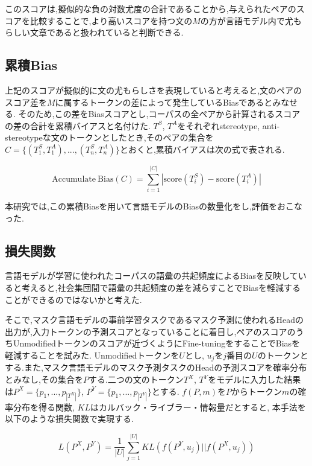 \documentclass[
  platex, dvipdfmx %
]{nlp2021}
\begin{document}
このスコアは,擬似的な負の対数尤度の合計であることから,与えられたペアのスコアを比較することで,より高いスコアを持つ文の$M$の方が言語モデル内で尤もらしい文章であると扱われていると判断できる.

\subsection{累積Bias}
上記のスコアが擬似的に文の尤もらしさを表現していると考えると,文のペアのスコア差を$M$に属するトークンの差によって発生しているBiasであるとみなせる.
そのため,この差をBiasスコアとし,コーパスの全ペアから計算されるスコアの差の合計を累積バイアスと名付けた.
$T^S$, $T^A$をそれぞれstereotype, anti-stereotypeな文のトークンとしたとき,そのペアの集合を$C = \{(T_1^S, T_1^A), ... , (T_n^S, T_n^A)\}$とおくと,累積バイアスは次の式で表される.

\begin{equation}
\mathrm{Accumulate\ Bias}(C) = \sum_{i=1}^{|C|}|\mathrm{score}(T_i^S) - \mathrm{score}(T_i^A)|
\label{eq:bias_score}
\end{equation}

本研究では,この累積Biasを用いて言語モデルのBiasの数量化をし,評価をおこなった.

\subsection{損失関数}
言語モデルが学習に使われたコーパスの語彙の共起頻度によるBiasを反映していると考えると,社会集団間で語彙の共起頻度の差を減らすことでBiasを軽減することができるのではないかと考えた.

そこで,マスク言語モデルの事前学習タスクであるマスク予測に使われるHeadの出力が,入力トークンの予測スコアとなっていることに着目し,ペアのスコアのうちUnmodifiedトークンのスコアが近づくようにFine-tuningをすることでBiasを軽減することを試みた.
Unmodifiedトークンを$U$とし, $u_j$を$j$番目の$U$のトークンとする.また,マスク言語モデルのマスク予測タスクのHeadの予測スコアを確率分布とみなし,その集合を$P$する.二つの文のトークン$T^X$, $T^Y$をモデルに入力した結果は$P^X = \{p_1, ..., p_{|T^X|}\}$, $P^Y = \{p_1, ..., p_{|T^Y|}\}$とする. $f(P, m)$を$P$からトークン$m$の確率分布を得る関数, $KL$はカルバック・ライブラー・情報量だとすると, 本手法を以下のような損失関数で実現する.

\begin{equation}
\label{eq:loss_function}
L(P^X, P^Y) = \frac{1}{|U|}\sum_{j=1}^{|U|}{KL(f(P^Y, u_j) || f(P^X, u_j))}
\end{equation}
\end{document}
